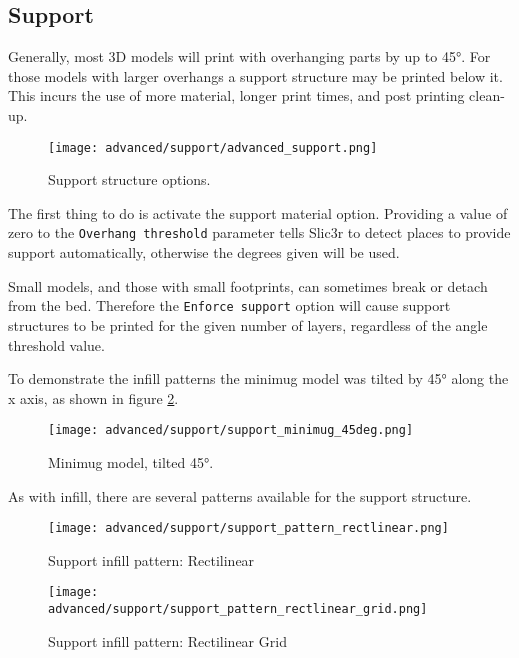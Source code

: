 \subsection{Support} %
\label{sec:support}

Generally, most 3D models will print with overhanging parts by up to 45°.  For those models with larger overhangs a support structure may be printed below it.  This incurs the use of more material, longer print times, and post printing clean-up.

\begin{figure}[H]
\centering
\texttt{[image: advanced/support/advanced\_support.png]}
\caption{Support structure options.}
\label{fig:advanced_support}
\end{figure}

The first thing to do is activate the support material option.  Providing a value of zero to the \texttt{Overhang threshold} parameter tells Slic3r to detect places to provide support automatically, otherwise the degrees given will be used.

Small models, and those with small footprints, can sometimes break or detach from the bed.  Therefore the \texttt{Enforce support} option will cause support structures to be printed for the given number of layers, regardless of the angle threshold value.

To demonstrate the infill patterns the minimug model was tilted by 45° along the x axis, as shown in figure \ref{fig:support_minimug_45deg}.

\begin{figure}[H]
\centering
\texttt{[image: advanced/support/support\_minimug\_45deg.png]}
\caption{Minimug model, tilted 45°.}
\label{fig:support_minimug_45deg}
\end{figure}


As with infill, there are several patterns available for the support structure.

\begin{figure}[H]
\centering
\texttt{[image: advanced/support/support\_pattern\_rectlinear.png]}
\caption{Support infill pattern: Rectilinear}
\label{fig:support_pattern_rectlinear}
\end{figure}

\begin{figure}[H]
\centering
\texttt{[image: advanced/support/support\_pattern\_rectlinear\_grid.png]}
\caption{Support infill pattern: Rectilinear Grid}
\label{fig:support_pattern_rectlinear_grid}
\end{figure}

